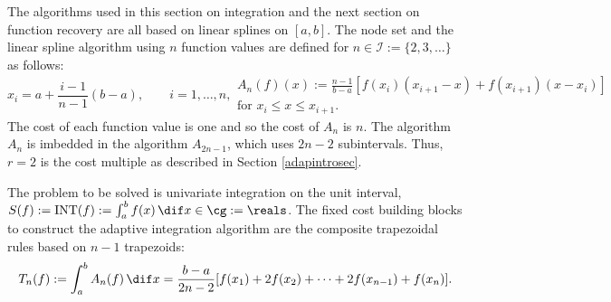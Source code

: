 \newpage
The algorithms used in this section on integration and the next section on function recovery are all based on linear splines on $[a,b]$.  The node set and the linear spline algorithm using $n$ function values are defined for $n \in \mathcal{I}:=\{2,3,\ldots\}$ as follows:
\begin{subequations} \label{linearspline}
\begin{equation}
x_i=a+\frac{i-1}{n-1}(b-a), \qquad i=1, \ldots, n,
\end{equation}
\begin{multline}
A_{n}(f)(x):=\frac{n-1}{b-a} \left[ f(x_{i})(x_{i+1}-x) +f(x_{i+1})(x-x_i) \right] \\ \text{for }x_i \leq x \leq x_{i+1}.
\end{multline}
\end{subequations}
The cost of each function value is one and so the cost of  $A_n$ is $n$. The algorithm $A_n$ is imbedded in the algorithm $A_{2n-1}$, which uses $2n-2$ subintervals.  Thus, $r=2$ is the cost multiple as described in Section \ref{adapintrosec}.

The problem to be solved is univariate integration on the unit interval, $S(f):=\INT(f):=\int_{a}^{b}f(x) \, \dif x \in \cg := \reals$.  The fixed cost building blocks to construct the adaptive integration algorithm are the composite trapezoidal rules based on $n-1$ trapezoids:
\begin{equation*}
    T_{n}(f) := \int_a^b A_n(f) \, \dif x
    =\frac{b-a}{2n-2}[f(x_1)+2f(x_2)+\cdots+2f(x_{n-1})+f(x_n)].
\end{equation*}

